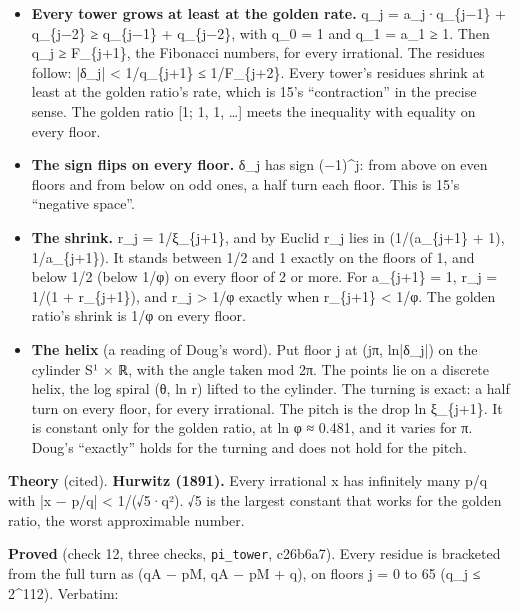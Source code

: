 \begin{itemize}
\item \textbf{Every tower grows at least at the golden rate.} q\_\allowbreak{}j = a\_\allowbreak{}j·q\_\allowbreak{}\{j−1\} + q\_\allowbreak{}\{j−2\} ≥ q\_\allowbreak{}\{j−1\} + q\_\allowbreak{}\{j−2\}, with q\_\allowbreak{}0 = 1 and q\_\allowbreak{}1 = a\_\allowbreak{}1 ≥ 1. Then q\_\allowbreak{}j ≥ F\_\allowbreak{}\{j+1\}, the Fibonacci numbers, for every irrational. The residues follow: |δ\_\allowbreak{}j| < 1/q\_\allowbreak{}\{j+1\} ≤ 1/F\_\allowbreak{}\{j+2\}. Every tower's residues shrink at least at the golden ratio's rate, which is 15's “contraction” in the precise sense. The golden ratio [1; 1, 1, …] meets the inequality with equality on every floor.
\item \textbf{The sign flips on every floor.} δ\_\allowbreak{}j has sign (−1)\textasciicircum{}j: from above on even floors and from below on odd ones, a half turn each floor. This is 15's “negative space”.
\item \textbf{The shrink.} r\_\allowbreak{}j = 1/ξ\_\allowbreak{}\{j+1\}, and by Euclid r\_\allowbreak{}j lies in (1/(a\_\allowbreak{}\{j+1\} + 1), 1/a\_\allowbreak{}\{j+1\}). It stands between 1/2 and 1 exactly on the floors of 1, and below 1/2 (below 1/φ) on every floor of 2 or more. For a\_\allowbreak{}\{j+1\} = 1, r\_\allowbreak{}j = 1/(1 + r\_\allowbreak{}\{j+1\}), and r\_\allowbreak{}j > 1/φ exactly when r\_\allowbreak{}\{j+1\} < 1/φ. The golden ratio's shrink is 1/φ on every floor.
\item \textbf{The helix} (a reading of Doug's word). Put floor j at (jπ, ln|δ\_\allowbreak{}j|) on the cylinder S¹ × ℝ, with the angle taken mod 2π. The points lie on a discrete helix, the log spiral (θ, ln r) lifted to the cylinder. The turning is exact: a half turn on every floor, for every irrational. The pitch is the drop ln ξ\_\allowbreak{}\{j+1\}. It is constant only for the golden ratio, at ln φ ≈ 0.481, and it varies for π. Doug's “exactly” holds for the turning and does not hold for the pitch.
\end{itemize}

\textbf{Theory} (cited). \textbf{Hurwitz (1891).} Every irrational x has infinitely many p/q with |x − p/q| < 1/(√5·q²). √5 is the largest constant that works for the golden ratio, the worst approximable number.

\textbf{Proved} (check 12, three checks, \texttt{pi\_\allowbreak{}tower}, c26b6a7). Every residue is bracketed from the full turn as (qA − pM, qA − pM + q), on floors j = 0 to 65 (q\_\allowbreak{}j ≤ 2\textasciicircum{}112). Verbatim:

